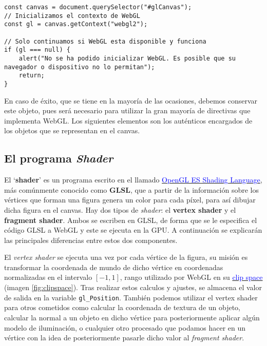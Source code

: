 \begin{lstlisting}
const canvas = document.querySelector("#glCanvas");
// Inicializamos el contexto de WebGL
const gl = canvas.getContext("webgl2");

// Solo continuamos si WebGL esta disponible y funciona
if (gl === null) {
    alert("No se ha podido inicializar WebGL. Es posible que su navegador o dispositivo no lo permitan");
    return;
}
\end{lstlisting}

En caso de éxito, que se tiene en la mayoría de las ocasiones, debemos conservar este objeto, pues será necesario para utilizar la gran mayoría de directivas que implementa WebGL. Los siguientes elementos son los auténticos encargados de los objetos que se representan en el canvas.

\subsection{El programa \textit{Shader}}

El `\textbf{shader}' es un programa escrito en el llamado \href{https://www.khronos.org/registry/OpenGL/specs/es/3.2/GLSL_ES_Specification_3.20.pdf}{\textcolor{blue}{OpenGL ES Shading Language}}, más comúnmente conocido como \textbf{GLSL}, que a partir de la información sobre los vértices que forman una figura genera un color para cada píxel, para así dibujar dicha figura en el canvas. Hay dos tipos de \textit{shader}: el \textbf{vertex shader} y el \textbf{fragment shader}. Ambos se escriben en GLSL, de forma que se le especifica el código GLSL a WebGL y este se ejecuta en la GPU. A continuación se explicarán las principales diferencias entre estos dos componentes.

El \textit{vertex shader} se ejecuta una vez por cada vértice de la figura, su misión es transformar la coordenada de mundo de dicho vértice en coordenadas normalizadas en el intervalo $[-1,1]$, rango utilizado por WebGL en su \href{https://developer.mozilla.org/en-US/docs/Web/API/WebGL_API/WebGL_model_view_projection#clip_space}{\textcolor{blue}{clip space}} (imagen \ref{fig:clipspace}). Tras realizar estos calculos y ajustes, se almacena el valor de salida en la variable \verb|gl_Position|. También podemos utilizar el vertex shader para otros cometidos como calcular la coordenada de textura de un objeto, calcular la normal a un objeto en dicho vértice para posteriormente aplicar algún modelo de iluminación, o cualquier otro procesado que podamos hacer en un vértice con la idea de posteriormente pasarle dicho valor al \textit{fragment shader}.


